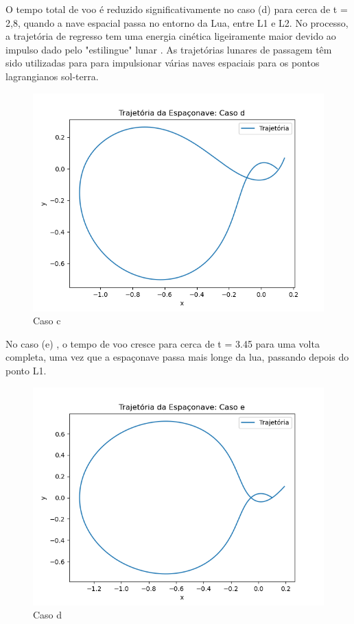 \par O tempo total de voo é reduzido significativamente no caso (d) para cerca de t = 2,8, quando a nave espacial passa no entorno da Lua, entre L1 e L2. No processo, a trajetória de regresso tem uma energia cinética ligeiramente maior devido ao impulso dado pelo "estilingue" lunar . As trajetórias lunares de passagem têm sido utilizadas para para impulsionar várias naves espaciais para os pontos lagrangianos sol-terra.

\begin{figure}[H]
\centering
\caption{Caso c}
\label{fig: }
\includegraphics[width=1\textwidth]{figuras/Resultados/7.3/73casod.png}
\end{figure}

 No caso (e) , o tempo de voo cresce para cerca de
 t = 3.45 para uma volta completa, uma vez que a espaçonave passa mais longe da lua, passando depois do ponto L1.


\begin{figure}[H]
\centering
\caption{Caso d}
\label{fig: }
\includegraphics[width=1\textwidth]{figuras/Resultados/7.3/73casoe.png}
\end{figure}

